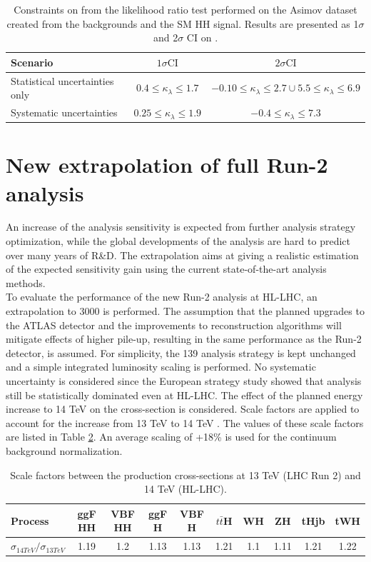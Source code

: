 \begin{table}[htbp]
    \centering
    \begin{tabular}{lcc}
\hline \hline Scenario & $1 \sigma \mathrm{CI}$ & $2 \sigma \mathrm{CI}$ \\
\hline Statistical uncertainties only & $0.4 \leq \kappa_{\lambda} \leq 1.7$ & $-0.10 \leq \kappa_{\lambda} \leq 2.7 \cup 5.5 \leq \kappa_{\lambda} \leq 6.9$ \\
Systematic uncertainties & $0.25 \leq \kappa_{\lambda} \leq 1.9$ & $-0.4 \leq \kappa_{\lambda} \leq 7.3$ \\
\hline \hline
\end{tabular}
    \caption{Constraints on \kl from the likelihood ratio test performed on the Asimov dataset created from the backgrounds and the SM HH signal. Results are presented as 1$\sigma$ and 2$\sigma$ CI on \kl.}
    \label{tab:HL-LHC:Comb:CI}
\end{table}


\section{New extrapolation of full Run-2 \HHyybb analysis}
An increase of the analysis sensitivity is expected from further analysis strategy optimization, while the global developments of the analysis are hard to predict over many years of R\&D. The extrapolation aims at giving a realistic estimation of the expected sensitivity gain using the current state-of-the-art analysis methods.\\
To evaluate the performance of the new Run-2 \HHyybb analysis  at HL-LHC, an extrapolation to 3000 \ifb is performed. The assumption that the planned upgrades to the ATLAS detector and the improvements to reconstruction algorithms will mitigate effects of higher pile-up, resulting in the same performance as the Run-2 detector, is assumed. For simplicity, the 139 \ifb analysis strategy is kept unchanged and a simple integrated luminosity scaling is performed. No systematic uncertainty is considered since the European strategy study showed that \bbyy analysis still be statistically dominated even at HL-LHC. The effect of the planned energy increase to 14 TeV on the cross-section is considered. Scale factors are applied to account for the increase from 13 TeV to 14 TeV \cite{CERN_yellow}. The values of these scale factors are listed in Table \ref{tab:HL-LHC:XSec}. An average scaling of +18\% is used for the continuum background normalization.

\begin{table}[htbp]
    \centering
    \begin{tabular}{lccccccccc}
    \hline\hline
    Process & ggF HH & VBF HH & ggF H & VBF H & $t\bar{t}$H & WH & ZH & tHjb & tWH \\
    \hline
    $\sigma_{14TeV}/\sigma_{13TeV}$ & 1.19 & 1.2 & 1.13 & 1.13 & 1.21 & 1.1 & 1.11 & 1.21 & 1.22 \\
    \hline\hline
    \end{tabular}
    \caption{Scale factors between the production cross-sections at 13 TeV (LHC Run 2) and 14 TeV (HL-LHC). }
    \label{tab:HL-LHC:XSec}
\end{table}


